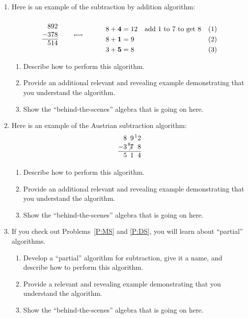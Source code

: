\begin{problems}
\begin{enumerate}
\begin{enumerate}
\end{enumerate}
\item Here is an example of the subtraction by addition
  algorithm:
\[
\begin{array}[c]{@{}r@{}}
892\\
-378\\ \hline
514
\end{array} 
\qquad\leftrightsquigarrow\qquad
\begin{minipage}{40ex}
\begin{align*}
8 + \textbf{4} &= 12 & &\text{add $1$ to $7$ to get $8$} \\
8 + \textbf{1} &= 9 \\
3 + \textbf{5} &= 8
\end{align*}
\end{minipage}
\]
\begin{enumerate}
\item Describe how to perform this algorithm.
\item Provide an additional relevant and revealing example
  demonstrating that you understand the algorithm.
\item Show the ``behind-the-scenes'' algebra that is going on here.
\end{enumerate}


\item Here is an example of the Austrian subtraction
  algorithm:
\[
\begin{array}{@{}r@{}r@{}r@{}r@{}}
& 8 & 9 & \hspace{.3ex}\leftexp{1}2\\
- & 3 & \hspace{.3ex}\leftexp{8}{\hspace{-.8ex}\not{\hspace{0ex}7}} & 8\\ \hline
& 5 & 1 & 4
\end{array}
\]
\begin{enumerate}
\item Describe how to perform this algorithm.
\item Provide an additional relevant and revealing example
  demonstrating that you understand the algorithm.
\item Show the ``behind-the-scenes'' algebra that is going on here.
\end{enumerate}

\item If you check out Problems~\ref{P:MS} and \ref{P:DS}, you will
  learn about ``partial'' algorithms.
\begin{enumerate}
\item Develop a ``partial'' algorithm for subtraction, give it a name, and describe how to
  perform this algorithm.
\item Provide a relevant and revealing example demonstrating that you
  understand the algorithm.
\item Show the ``behind-the-scenes'' algebra that is going on here.
\end{enumerate}



\end{enumerate}
\end{problems}
